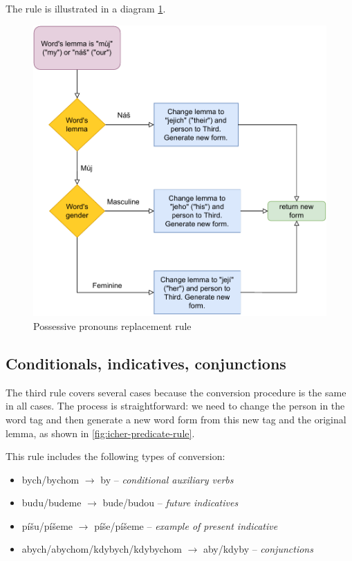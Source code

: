 The rule is illustrated in a diagram \ref{fig:icher-posspron-rule}.

\begin{figure}[!htbp]
\includegraphics[width=\textwidth]{data/Icher-Posspron-Rule.pdf}
\caption{Possessive pronouns replacement rule}
\label{fig:icher-posspron-rule}
\end{figure}

\subsection{Conditionals, indicatives, conjunctions}

The third rule covers several cases because the conversion procedure is the same in all cases. The process is straightforward: we need to change the person in the word tag and then generate a new word form from this new tag and the original lemma, as shown in \ref{fig:icher-predicate-rule}.

This rule includes the following types of conversion:
\begin{itemize}
	\item bych/bychom $\rightarrow$ by -- \emph{conditional auxiliary verbs}
	\item budu/budeme $\rightarrow$ bude/budou -- \emph{future indicatives}
	\item píšu/píšeme $\rightarrow$ píše/píšeme -- \emph{example of present indicative}
	\item abych/abychom/kdybych/kdybychom $\rightarrow$ aby/kdyby -- \emph{conjunctions}
\end{itemize}


